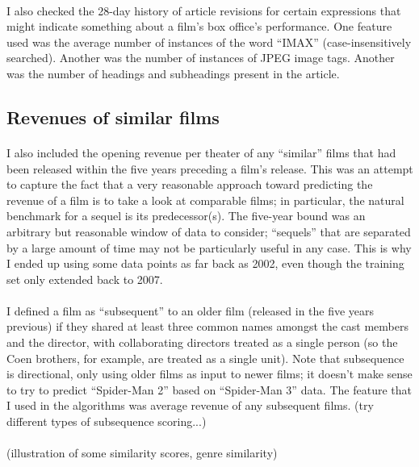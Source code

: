 \documentclass[10pt]{article}
\begin{document}
    \paragraph{}
    I also checked the 28-day history of article revisions for certain expressions that might indicate something about a film's box office's performance. One feature used was the average number of instances of the word ``IMAX'' (case-insensitively searched). Another was the number of instances of JPEG image tags. Another was the number of headings and subheadings present in the article. 
    
    \subsection{Revenues of similar films}
    
    \paragraph{}
    I also included the opening revenue per theater of any ``similar'' films that had been released within the five years preceding a film's release. This was an attempt to capture the fact that a very reasonable approach toward predicting the revenue of a film is to take a look at comparable films; in particular, the natural benchmark for a sequel is its predecessor(s). The five-year bound was an arbitrary but reasonable window of data to consider; ``sequels'' that are separated by a large amount of time may not be particularly useful in any case. This is why I ended up using some data points as far back as 2002, even though the training set only extended back to 2007. 
    
    \paragraph{}
    I defined a film as ``subsequent'' to an older film (released in the five years previous) if they shared at least three common names amongst the cast members and the director, with collaborating directors treated as a single person (so the Coen brothers, for example, are treated as a single unit). Note that subsequence is directional, only using older films as input to newer films; it doesn't make sense to try to predict ``Spider-Man 2'' based on ``Spider-Man 3'' data. The feature that I used in the algorithms was average revenue of any subsequent films. (try different types of subsequence scoring...)
    
    \paragraph{}
    (illustration of some similarity scores, genre similarity)
    
\end{document}
